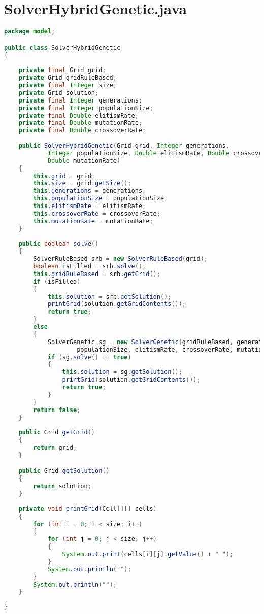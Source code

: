 \section{SolverHybridGenetic.java}
\label{sec:kodeprogramhg}

\begin{lstlisting}[language=Java,basicstyle=\tiny,caption=SolverHybridGenetic.java]
package model;

public class SolverHybridGenetic
{
    
    private final Grid grid;
    private Grid gridRuleBased;
    private final Integer size;
    private Grid solution;
    private final Integer generations;
    private final Integer populationSize;
    private final Double elitismRate;
    private final Double mutationRate;
    private final Double crossoverRate;
    
    public SolverHybridGenetic(Grid grid, Integer generations, 
            Integer populationSize, Double elitismRate, Double crossoverRate, 
            Double mutationRate)
    {
        this.grid = grid;
        this.size = grid.getSize();
        this.generations = generations;
        this.populationSize = populationSize;
        this.elitismRate = elitismRate;
        this.crossoverRate = crossoverRate;
        this.mutationRate = mutationRate;
    }
    
    public boolean solve()
    {
        SolverRuleBased srb = new SolverRuleBased(grid);
        boolean isFilled = srb.solve();
        this.gridRuleBased = srb.getGrid();
        if (isFilled)
        {
            this.solution = srb.getSolution();
            printGrid(solution.getGridContents());
            return true;
        }
        else
        {
            SolverGenetic sg = new SolverGenetic(gridRuleBased, generations, 
                    populationSize, elitismRate, crossoverRate, mutationRate);
            if (sg.solve() == true)
            {
                this.solution = sg.getSolution();
                printGrid(solution.getGridContents());
                return true;
            }
        }
        return false;
    }
    
    public Grid getGrid()
    {
        return grid;
    }

    public Grid getSolution()
    {
        return solution;
    }
    
    private void printGrid(Cell[][] cells)
    {
        for (int i = 0; i < size; i++)
        {
            for (int j = 0; j < size; j++)
            {
                System.out.print(cells[i][j].getValue() + " ");
            }
            System.out.println("");
        }
        System.out.println("");
    }
    
}
\end{lstlisting}

